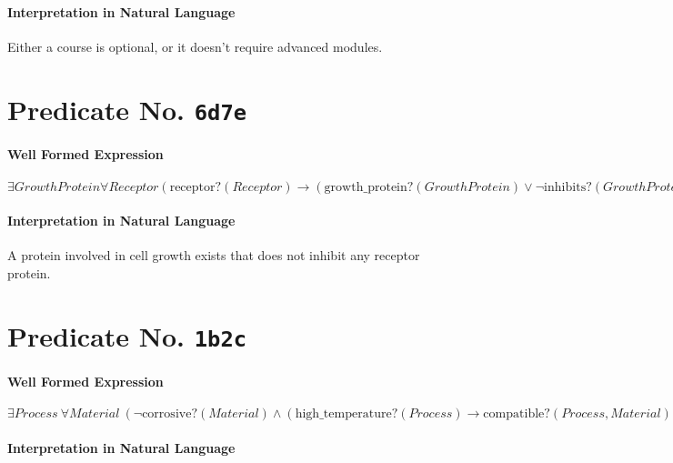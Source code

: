 \documentclass[11pt]{article}
\begin{document}
\paragraph*{Interpretation in Natural Language}
\label{sec:org41a46eb}

Either a course is optional, or it doesn't require advanced modules.



\section{Predicate No. \texttt{6d7e}}
\label{sec:org5c51742}

\paragraph*{Well Formed Expression}
\label{sec:orge7e7574}

\(\exists \mathit{GrowthProtein} \forall \mathit{Receptor} (\mathrm{receptor?}(\mathit{Receptor}) \rightarrow (\mathrm{growth\_protein?}(\mathit{GrowthProtein}) \lor \neg \mathrm{inhibits?}(\mathit{GrowthProtein}, \mathit{Receptor})))\)

\paragraph*{Interpretation in Natural Language}
\label{sec:org77ee72c}

A protein involved in cell growth exists that does not inhibit any receptor protein.



\section{Predicate No. \texttt{1b2c}}
\label{sec:orge1d3370}

\paragraph*{Well Formed Expression}
\label{sec:org8c231f2}

\(\exists \mathit{Process}\ \forall \mathit{Material}\ (\neg \mathrm{corrosive?}(\mathit{Material}) \land (\mathrm{high\_temperature?}(\mathit{Process}) \rightarrow \mathrm{compatible?}(\mathit{Process}, \mathit{Material})))\)

\paragraph*{Interpretation in Natural Language}
\label{sec:org87fc962}
\end{document}
